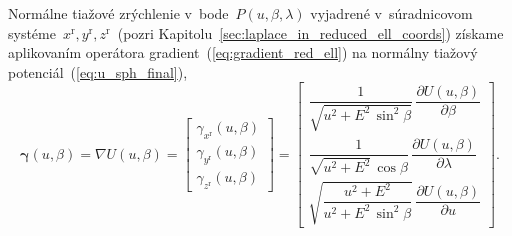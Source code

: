 \documentclass[a4paper, 12pt]{book}
\begin{document}
Normálne tiažové zrýchlenie v~bode~$P(u, \beta, \lambda)$ vyjadrené 
v~súradnicovom systéme~$x^\mathrm{r}, y^\mathrm{r}, z^\mathrm{r}$~(pozri 
Kapitolu~\ref{sec:laplace_in_reduced_ell_coords}) získame aplikovaním operátora 
gradient~(\ref{eq:gradient_red_ell}) na normálny tiažový 
potenciál~(\ref{eq:u_sph_final}),
%
\begin{equation}
\label{eq:gamma_vec_general}
\boldsymbol \gamma(u, \beta) = \nabla U(u, \beta)
%
=
%
\begin{bmatrix}
\gamma_{x^\mathrm{r}}(u, \beta)\\
\gamma_{y^\mathrm{r}}(u, \beta)\\
\gamma_{z^\mathrm{r}}(u, \beta)
\end{bmatrix}
%
=
%
\begin{bmatrix}
\dfrac{1}{\sqrt{u^2 + E^2 \, \sin^2\beta}} \, \dfrac{\partial U(u, 
\beta)}{\partial \beta}\\[2ex]
\dfrac{1}{\sqrt{u^2 + E^2} \, \cos\beta} \, \dfrac{\partial U(u, 
\beta)}{\partial \lambda}\\[2ex]
\sqrt{\dfrac{u^2 + E^2}{u^2 + E^2 \, \sin^2\beta}} \, \dfrac{\partial U(u, 
\beta)}{\partial u}
\end{bmatrix}
%
{.}
\end{equation}
\end{document}
